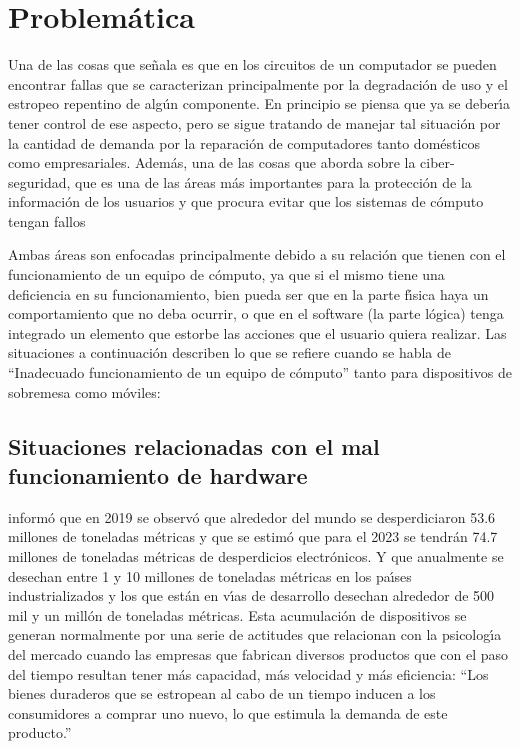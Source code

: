 \pagebreak
\section{Problem\'atica}

Una de las cosas que se\~nala \textcite{Jin2023} es que en los circuitos de un
computador se pueden encontrar fallas que se caracterizan principalmente por la
degradaci\'on de uso y el estropeo repentino de alg\'un componente. En principio
se piensa que ya se deber\'{\i}a tener control de ese aspecto, pero se sigue tratando
de manejar tal situaci\'on por la cantidad de demanda por la reparaci\'on de
computadores tanto dom\'esticos como empresariales. Adem\'as, una de las cosas que
\textcite{Aboaoja2022} aborda sobre la ciber-seguridad, que es una de las \'areas
m\'as importantes para la protecci\'on de la informaci\'on de los usuarios y que
procura evitar que los sistemas de c\'omputo tengan fallos

Ambas \'areas son enfocadas principalmente debido a su relaci\'on que tienen con el
funcionamiento de un equipo de c\'omputo, ya que si el mismo tiene una deficiencia
en su funcionamiento, bien pueda ser que en la parte f\'{\i}sica haya un
comportamiento que no deba ocurrir, o que en el software (la parte l\'ogica) tenga
integrado un elemento que estorbe las acciones que el usuario quiera realizar.
Las situaciones a continuaci\'on describen lo que se refiere cuando se habla de
``Inadecuado funcionamiento de un equipo de c\'omputo'' tanto para dispositivos de
sobremesa como m\'oviles:

\subsection{Situaciones relacionadas con el mal funcionamiento de hardware}

\textcite{Herat2020} inform\'o que en 2019 se observ\'o que alrededor del mundo se
desperdiciaron 53.6 millones de toneladas m\'etricas y que se estim\'o que para el
2023 se tendr\'an 74.7 millones de toneladas m\'etricas de desperdicios
electr\'onicos. Y que anualmente se desechan entre 1 y 10 millones de toneladas
m\'etricas en los pa\'{\i}ses industrializados y los que est\'an en v\'{\i}as de desarrollo
desechan alrededor de 500 mil y un mill\'on de toneladas m\'etricas. Esta
acumulaci\'on de dispositivos se generan normalmente por una serie de actitudes
que \textcite{Hartl2023} relacionan con la psicolog\'{\i}a del mercado cuando las
empresas que fabrican diversos productos que con el paso del tiempo resultan
tener m\'as capacidad, m\'as velocidad y m\'as eficiencia: ``Los bienes duraderos
que se estropean al cabo de un tiempo inducen a los consumidores a comprar uno
nuevo, lo que estimula la demanda de este producto.''

